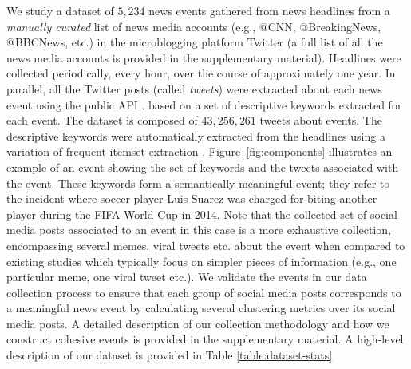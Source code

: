 \documentclass[10pt,letterpaper]{article}
\begin{document}
We study a dataset of $5,234$ news events gathered from news
headlines from a \emph{manually curated} list of news media
accounts (e.g., @CNN, @BreakingNews, @BBCNews, etc.) in the
microblogging platform Twitter \cite{Twitter_website}
(a full list of all the news media
accounts is provided in the supplementary material). Headlines were
collected periodically, every hour, over the course of approximately
one year. In parallel, all the Twitter posts (called \emph{tweets})
were extracted about each news event using the public
API \cite{Twitter_API}.
based on a set of descriptive keywords extracted for each event. The
dataset is composed of $43,256,261$ tweets about events.
The descriptive keywords were automatically extracted from the
headlines using a variation of frequent itemset extraction
\cite{Tan_Steinbach_Kumar}. Figure~\ref{fig:components} illustrates an
example of an event showing the set of keywords and the tweets
associated with the event. These keywords form a semantically
meaningful event; they refer to the incident where soccer player Luis
Suarez was charged for biting another player during the FIFA World Cup
in 2014. Note that the collected set of social media posts associated to an event in this case is a
more exhaustive collection, encompassing several memes, viral tweets etc. about
the event when compared to existing studies
\cite{Castillo:2014,Szabo:2010,Lerman:2010,Tatar:2011,Pinto:2013,Ahmed:2013,Zaman_information_spreading,suh2010want}
which typically focus on simpler pieces of information (e.g., one particular meme, one viral tweet etc.).
We validate the events in our data collection process to ensure that
each group of social media posts corresponds to a meaningful news
event by calculating several clustering metrics over its social
media posts.  A detailed description of our
collection methodology and how we construct cohesive events is
provided in the supplementary material.
A high-level description of our dataset is provided in Table \ref{table:dataset-stats}
\end{document}
